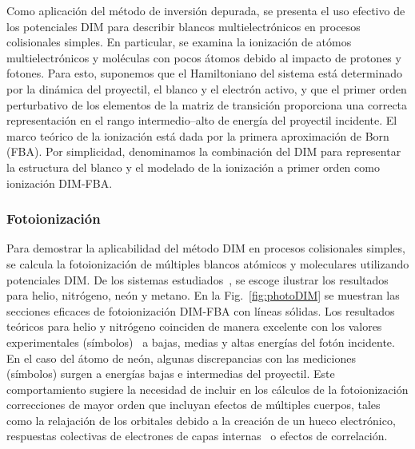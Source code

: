 Como aplicación del método de inversión depurada, se presenta el uso 
efectivo de los potenciales DIM para describir blancos multielectrónicos 
en procesos colisionales simples. En particular, se examina la 
ionización de atómos multielectrónicos y moléculas con pocos átomos 
debido al impacto de protones y fotones. 
Para esto, suponemos que el Hamiltoniano del sistema está determinado 
por la dinámica del proyectil, el blanco y el electrón activo, y que el 
primer orden perturbativo de los elementos de la matriz de transición 
proporciona una correcta representación en el rango intermedio--alto
de energía del proyectil incidente. El marco teórico de la ionización
está dada por la primera aproximación de Born (FBA). %
Por simplicidad, denominamos la combinación del DIM para representar la 
estructura del blanco y el modelado de la ionización a primer orden como 
ionización DIM-FBA. 

\subsubsection{Fotoionización}

Para demostrar la aplicabilidad del método DIM en procesos colisionales 
simples, se calcula la fotoionización de múltiples blancos atómicos y 
moleculares utilizando potenciales DIM. De los sistemas 
estudiados~\cite{Mendez:19dim}, se escoge ilustrar los resultados para 
helio, nitrógeno, 
neón y metano. En la Fig.~\ref{fig:photoDIM} se muestran las secciones
eficaces de fotoionización DIM-FBA con 
líneas sólidas. Los resultados teóricos para helio y nitrógeno coinciden 
de manera excelente con los valores experimentales 
(símbolos)~\cite{Samson:90,Henke:93,Stolte:16} a bajas, medias y altas 
energías del fotón incidente. En el caso del átomo de neón, algunas 
discrepancias con las mediciones (símbolos) \cite{Henke:93,Samson:02} 
surgen a energías bajas e intermedias del proyectil. Este 
comportamiento sugiere la necesidad de incluir en los cálculos de la 
fotoionización correcciones de mayor orden que incluyan efectos de 
múltiples cuerpos, tales como la relajación de los orbitales 
debido a la creación de un hueco electrónico, respuestas colectivas de 
electrones de capas internas~\cite{Ederer:64} o efectos de correlación.

